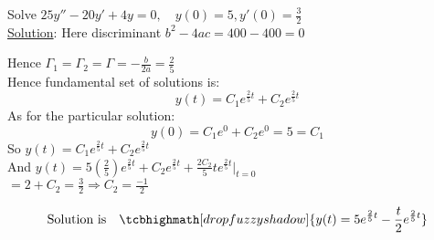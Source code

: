 \begin{example-N}
	Solve $25y'' - 20y' + 4y = 0, \quad y(0) = 5, y'(0) = \frac{3}{2}$\\
	\underline{Solution}: Here discriminant $b^2 - 4ac = 400 - 400 = 0$\\
	\begin{center}
	Hence $\Gamma_1 = \Gamma_2 = \Gamma = -\frac{b}{2a} = \frac{2}{5}$\\
	Hence fundamental set of solutions is:
	\begin{equation*}
		y(t) = C_1 e^{\frac{2}{5}t} + C_2 e^{\frac{2}{5}t}
	\end{equation*}
	As for the particular solution:
	\begin{equation*}
		y(0) = C_1 e^0 + C_2 e^0 = 5 = C_1
	\end{equation*}
	So $y(t) = C_1 e^{\frac{2}{5}t} + C_2 e^{\frac{2}{5}t}$\\
	And $y(t) = 5 (\frac{2}{5}) e^{\frac{2}{5}t} + C_2 e^{\frac{2}{5}t} + \frac{2C_2}{5}t e^{\frac{2}{5}t} \Bigg|_{t = 0}$\\
	$ = 2 + C_2 = \frac{3}{2} \Rightarrow C_2 = \frac{-1}{2}$
	\end{center}
	\begin{equation*}
		\text{Solution is} \quad \tcbhighmath[drop fuzzy shadow]{y(t) = 5 e^{\frac{2}{5}t} - \frac{t}{2} e^{\frac{2}{5}t}}
	\end{equation*}
\end{example-N}

